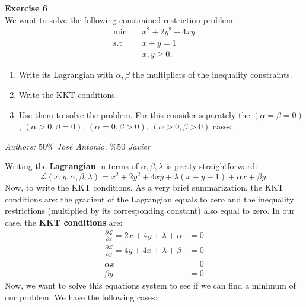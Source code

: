 \documentclass[11pt,table]{article}
\newenvironment{problem}[2][Exercise]
{ \begin{mdframed}[backgroundcolor=gray!20] \textbf{#1 #2} \\}
	{\hspace{0.0cm}\newline\newline \emph{Authors: \(50\%\) José Antonio, \(\%50\) Javier}  \end{mdframed}}
\begin{document}
\begin{problem}{6}
We want to solve the following constrained restriction problem:
\begin{align*}
	\min \quad       & x^{2} + 2y^{2} + 4xy \\
	\text{s.t} \quad & x + y = 1            \\
	                 & x,y \geq 0.
\end{align*}
\begin{enumerate}
	\item Write its Lagrangian with \(\alpha,\beta\) the multipliers of the inequality constraints.
	\item Write the KKT conditions.
	\item Use them to solve the problem. For this consider separately the \((\alpha = \beta = 0)\), \((\alpha > 0, \beta = 0)\), \((\alpha = 0, \beta > 0)\), \((\alpha > 0, \beta > 0)\) cases.
\end{enumerate}
\end{problem}

Writing the \textbf{Lagrangian} in terms of \(\alpha,\beta,\lambda\) is pretty straightforward:
\[
	\mathcal L(x,y,\alpha,\beta,\lambda) = x^{2} + 2y^{2} + 4xy + \lambda(x+y - 1) + \alpha x + \beta y .
\]
Now, to write the KKT conditions. As a very brief summarization, the KKT conditions are: the gradient of the Lagrangian equals to zero and the inequality restrictions (multiplied by its corresponding constant) also equal to zero. In our case, the \textbf{KKT conditions} are:
\begin{align*}
	\frac{\partial \mathcal L}{\partial x}  = 2x + 4y + \lambda + \alpha & = 0 \\
	\frac{\partial \mathcal L}{\partial y}  = 4y + 4x + \lambda + \beta  & = 0 \\
	\alpha x                                                             & = 0 \\
	\beta y                                                              & = 0
\end{align*}
Now, we want to solve this equations system to see if we can find a minimum of our problem. We have the following cases:
\end{document}

